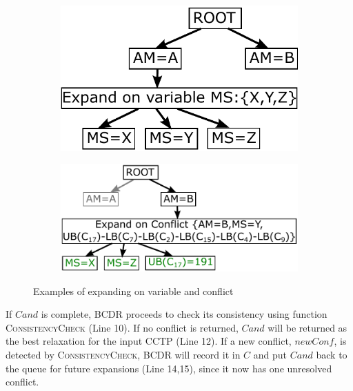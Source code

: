 \documentclass[jair,twoside,11pt,theapa]{article}
\begin{document}
\begin{figure}[h!]
	\centering
	\begin{subfigure}[b]{0.38\textwidth}
		\includegraphics[width=\textwidth]{figures/expand_on_variable.pdf}
		\caption{}
		\label{fig:ExpandOnVariable}
	\end{subfigure}
	\hspace{1cm}
	\begin{subfigure}[b]{0.52\textwidth}
		\includegraphics[width=\textwidth]{figures/expand_on_conflict.pdf}
		\caption{}
		\label{fig:ExpandOnConflict}
	\end{subfigure}
	\caption{Examples of expanding on variable and conflict}
\end{figure} 



If $\mathit{Cand}$ is complete, BCDR proceeds to check its consistency using function
\textsc{ConsistencyCheck} (Line 10). If no conflict is returned, $\mathit{Cand}$ will be
returned as the best relaxation for the input CCTP (Line 12). If a new conflict,
$\mathit{newConf}$, is detected by \textsc{ConsistencyCheck}, BCDR will record it in $C$
and put $\mathit{Cand}$ back to the queue for future expansions (Line 14,15), since it
now has one unresolved conflict.
\end{document}

